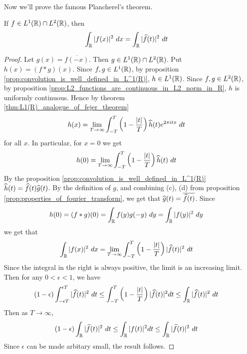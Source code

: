 Now we'll prove the famous Plancherel's theorem.
\begin{theorem}
  \label{thm:Plancherel's_theorem}
  If $f \in L^1(\mathbb R) \cap L^2(\mathbb R)$, then $$\int_\R |f(x)|^2 \ dx = \int_\R |\hatf(t)|^2 \ dt $$
\end{theorem}
\begin{proof}
  Let $g(x) = \overline{f(-x)}$. Then $g \in L^1(\mathbb R)\cap L^2(\mathbb R)$. Put $h(x) = (f*g)(x)$. Since $f, g \in L^1(\mathbb R)$, by proposition \ref{prop:convolution_is_well_defined_in_L^1(R)}, $h \in L^1(\mathbb R)$. Since $f, g \in L^2(\mathbb R)$, by proposition \ref{prop:L2_functions_are_continuous_in_L2_norm_in_R}, $h$ is uniformly continuous. 
  Hence by theorem \ref{thm:L1(R)_analogue_of_fejer_theorem}  $$h(x) = \lim_{T\to \infty} \int_{-T}^T \left(1-\frac{|t|}{T}\right) \widehat{h}(t)e^{2\pi itx} \ dt $$ for all $x$. In particular, for $x=0$ we get $$h(0) = \lim_{T\to \infty} \int_{-T}^T \left(1-\frac{|t|}{T}\right) \widehat{h}(t) \ dt$$
  By the proposition \ref{prop:convolution_is_well_defined_in_L^1(R)} $\widehat{h}(t) = \widehat{f}(t)\widehat{g}(t)$. By the definition of $g$, and combining (c), (d) from proposition \ref{prop:properties_of_fourier_transform}, we get that $\widehat{g}(t) = \overline{\widehat{f}(t)}$.
  Since $$h(0) = (f*g)(0) = \int_\mathbb R f(y)g(-y) \ dy = \int_\mathbb R |f(y)|^2 \ dy$$
  we get that $$\int_\R |f(x)|^2 \ dx = \lim_{T\to \infty} \int_{-T}^T \left(1-\frac{|t|}{T}\right) |\hatf(t)|^2 \ dt$$
  Since the integral in the right is always positive, the limit is an increasing limit. Then for any $0<\epsilon<1$, we have $$(1-\epsilon) \int_{-\epsilon T}^{\epsilon T} |\hatf(t)|^2 \ dt \le \int_{-T}^{T} \left( 1-\frac{|t|}{T} \right) |\hatf(t)|^2 dt \le \int_\R |\hatf(t)|^2 \ dt$$
  Then as $T \to \infty$, $$(1-\epsilon) \int_\mathbb R |\widehat{f}(t)|^2 \ dt \le \int_{\mathbb R} |f(t)|^2 dt \le \int_\mathbb R |\widehat{f}(t)|^2 \ dt$$
  Since $\epsilon$ can be made arbitary small, the result follows.
\end{proof}


